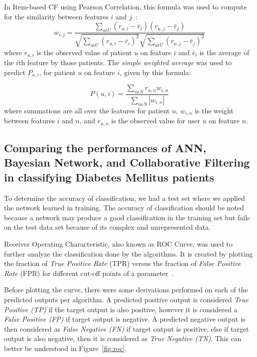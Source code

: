 \documentclass[journal]{./IEEE/IEEEtran}
\begin{document}
	In Item-based CF using Pearson Correlation, this formula was used to compute for the similarity between features $i$ and $j$~\cite{Salton83}:	
\begin{equation}
w_{i,j}=\frac{\sum_{u \epsilon U}(r_{u,i}-\bar r_i)(r_{u,j}-\bar r_j)}{\sqrt{\sum_{u \epsilon U}(r_{u,i}-\bar r_i)^2}\sqrt{\sum_{u \epsilon U}(r_{u,j}-\bar r_j)^2}}
\end{equation}
where $r_{u,i}$ is the observed value of patient $u$ on feature $i$ and $\bar r_i$ is the average of the $i$th feature by those patients. The {\it simple weighted average} was used to predict $P_{u,i}$, for patient $u$ on feature $i$, given by this formula:

\begin{equation}
P(u,i)=\frac{\sum_{n\epsilon N}r_{u,n}w_{i,n}}{\sum_{n\epsilon N}\left | w_{i,n} \right |}
\end{equation}
where summations are all over the features for patient $u$, $w_{i,n}$ is the weight between features $i$ and $n$, and $r_{u,n}$ is the observed value for user $u$ on feature $n$.

\subsection{Comparing the performances of ANN, Bayesian Network, and Collaborative Filtering in classifying Diabetes Mellitus patients}
	To determine the accuracy of classification, we had a test set where we applied the network learned in training. The accuracy of classification should be noted because a network may produce a good classification in the training set but fails on the test data set because of its complex and unrepresented data.
	
	Receiver Operating Characteristic, also known as ROC Curve, was used to further analyze the classification done by the algorithms. It is created by plotting the fraction of {\it True Positive Rate} (TPR) versus the fraction of {\it False Positive Rate} (FPR) for different cut-off points of a parameter~\cite{ROC13}. 
	
	Before plotting the curve, there were some derivations performed on each of the predicted outputs per algorithm. A predicted positive output is considered {\it True Positive (TP)} if the target output is also positive, however it is considered a {\it False Positive (FP)} if target output is negative. A predicted negative output is then considered as {\it False Negative (FN)} if target output is positive, else if target output is also negative, then it is considered as {\it True Negative (TN)}. This can better be understood in Figure~\ref{fig:roc}.
\end{document}
